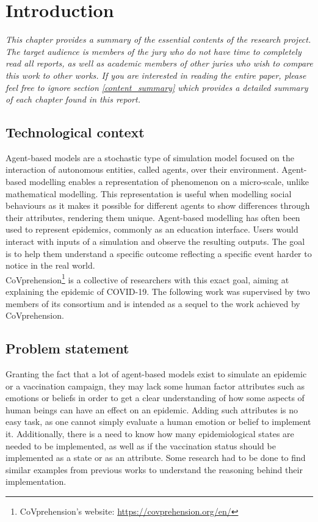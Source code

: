 \chapter{Introduction}

\textit{This chapter provides a summary of the essential contents of the research project. The target audience is members of the jury who do not have time to completely read all reports, as well as academic members of other juries who wish to compare this work to other works. If you are interested in reading the entire paper, please feel free to ignore section \ref{content_summary} which provides a detailed summary of each chapter found in this report.}



\section{Technological context}

Agent-based models are a stochastic type of simulation model focused on the interaction of autonomous entities, called agents, over their environment. Agent-based modelling enables a representation of phenomenon on a micro-scale, unlike mathematical modelling. This representation is useful when modelling social behaviours as it makes it possible for different agents to show differences through their attributes, rendering them unique.
Agent-based modelling has often been used to represent epidemics, commonly as an education interface. Users would interact with inputs of a simulation and observe the resulting outputs. The goal is to help them understand a specific outcome reflecting a specific event harder to notice in the real world.
\\CoVprehension\footnote{CoVprehension's website: \url{https://covprehension.org/en/}} is a collective of researchers with this exact goal, aiming at explaining the epidemic of COVID-19. The following work was supervised by two members of its consortium and is intended as a sequel to the work achieved by CoVprehension.



\section{Problem statement}

Granting the fact that a lot of agent-based models exist to simulate an epidemic or a vaccination campaign, they may lack some human factor attributes such as emotions or beliefs in order to get a clear understanding of how some aspects of human beings can have an effect on an epidemic. Adding such attributes is no easy task, as one cannot simply evaluate a human emotion or belief to implement it.
Additionally, there is a need to know how many epidemiological states are needed to be implemented, as well as if the vaccination status should be implemented as a state or as an attribute.
Some research had to be done to find similar examples from previous works to understand the reasoning behind their implementation.



